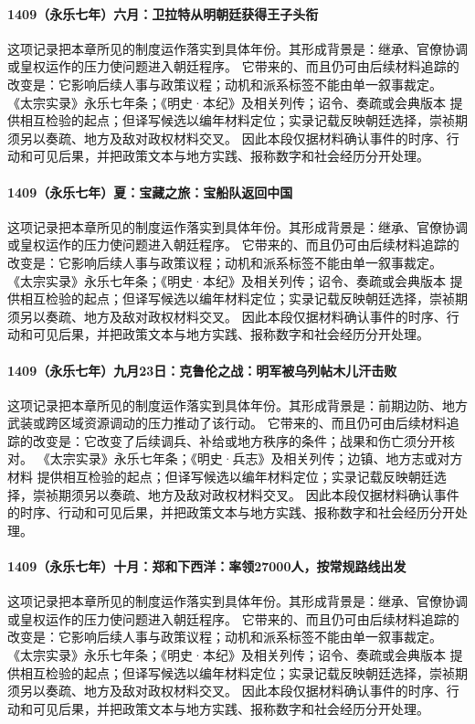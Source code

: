 \paragraph{1409（永乐七年）六月：卫拉特从明朝廷获得王子头衔} 这项记录把本章所见的制度运作落实到具体年份。其形成背景是：继承、官僚协调或皇权运作的压力使问题进入朝廷程序。 它带来的、而且仍可由后续材料追踪的改变是：它影响后续人事与政策议程；动机和派系标签不能由单一叙事裁定。 《太宗实录》永乐七年条；《明史·本纪》及相关列传；诏令、奏疏或会典版本 提供相互检验的起点；但译写候选以编年材料定位；实录记载反映朝廷选择，崇祯期须另以奏疏、地方及敌对政权材料交叉。 因此本段仅据材料确认事件的时序、行动和可见后果，并把政策文本与地方实践、报称数字和社会经历分开处理。

\paragraph{1409（永乐七年）夏：宝藏之旅：宝船队返回中国} 这项记录把本章所见的制度运作落实到具体年份。其形成背景是：继承、官僚协调或皇权运作的压力使问题进入朝廷程序。 它带来的、而且仍可由后续材料追踪的改变是：它影响后续人事与政策议程；动机和派系标签不能由单一叙事裁定。 《太宗实录》永乐七年条；《明史·本纪》及相关列传；诏令、奏疏或会典版本 提供相互检验的起点；但译写候选以编年材料定位；实录记载反映朝廷选择，崇祯期须另以奏疏、地方及敌对政权材料交叉。 因此本段仅据材料确认事件的时序、行动和可见后果，并把政策文本与地方实践、报称数字和社会经历分开处理。

\paragraph{1409（永乐七年）九月23日：克鲁伦之战：明军被乌列帖木儿汗击败} 这项记录把本章所见的制度运作落实到具体年份。其形成背景是：前期边防、地方武装或跨区域资源调动的压力推动了该行动。 它带来的、而且仍可由后续材料追踪的改变是：它改变了后续调兵、补给或地方秩序的条件；战果和伤亡须分开核对。 《太宗实录》永乐七年条；《明史·兵志》及相关列传；边镇、地方志或对方材料 提供相互检验的起点；但译写候选以编年材料定位；实录记载反映朝廷选择，崇祯期须另以奏疏、地方及敌对政权材料交叉。 因此本段仅据材料确认事件的时序、行动和可见后果，并把政策文本与地方实践、报称数字和社会经历分开处理。

\paragraph{1409（永乐七年）十月：郑和下西洋：率领27000人，按常规路线出发} 这项记录把本章所见的制度运作落实到具体年份。其形成背景是：继承、官僚协调或皇权运作的压力使问题进入朝廷程序。 它带来的、而且仍可由后续材料追踪的改变是：它影响后续人事与政策议程；动机和派系标签不能由单一叙事裁定。 《太宗实录》永乐七年条；《明史·本纪》及相关列传；诏令、奏疏或会典版本 提供相互检验的起点；但译写候选以编年材料定位；实录记载反映朝廷选择，崇祯期须另以奏疏、地方及敌对政权材料交叉。 因此本段仅据材料确认事件的时序、行动和可见后果，并把政策文本与地方实践、报称数字和社会经历分开处理。

